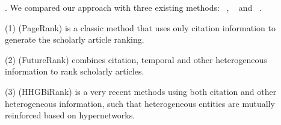 


.
We compared our approach \ensemblerank with three existing methods: \pagerank~\cite{Brin98:PageRank}, \futurerank~\cite{sayyadi09} and \hhgrank~\cite{Liang16AAAI}.

\noindent
(1) \pagerank (PageRank) is a classic method that uses only citation information to generate the scholarly article ranking.


\noindent
(2) \futurerank (FutureRank) combines citation, temporal and other heterogeneous information to rank scholarly articles.

\noindent
(3) \hhgrank (HHGBiRank) is a very recent methods using both citation and other heterogeneous information, such that heterogeneous entities are mutually reinforced based on hypernetworks.


